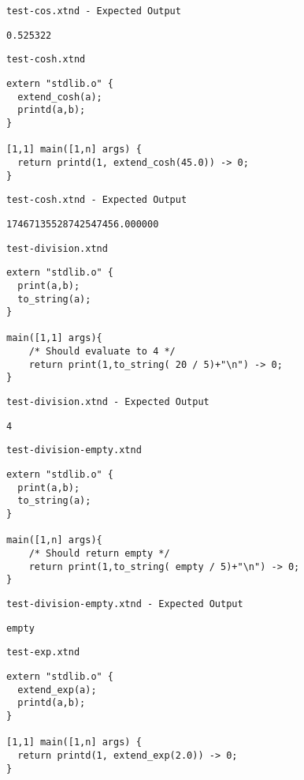 \medskip \noindent \texttt{test-cos.xtnd - Expected Output}


\begin{lstlisting}
0.525322
\end{lstlisting}


\medskip \noindent \texttt{test-cosh.xtnd}


\begin{lstlisting}
extern "stdlib.o" {
  extend_cosh(a);
  printd(a,b);
}

[1,1] main([1,n] args) {
  return printd(1, extend_cosh(45.0)) -> 0;
}
\end{lstlisting}


\medskip \noindent \texttt{test-cosh.xtnd - Expected Output}


\begin{lstlisting}
17467135528742547456.000000
\end{lstlisting}


\medskip \noindent \texttt{test-division.xtnd}


\begin{lstlisting}
extern "stdlib.o" {
  print(a,b);
  to_string(a);
}

main([1,1] args){
	/* Should evaluate to 4 */
	return print(1,to_string( 20 / 5)+"\n") -> 0;
}
\end{lstlisting}


\medskip \noindent \texttt{test-division.xtnd - Expected Output}


\begin{lstlisting}
4
\end{lstlisting}


\medskip \noindent \texttt{test-division-empty.xtnd}


\begin{lstlisting}
extern "stdlib.o" {
  print(a,b);
  to_string(a);
}

main([1,n] args){
	/* Should return empty */
	return print(1,to_string( empty / 5)+"\n") -> 0;
}
\end{lstlisting}


\medskip \noindent \texttt{test-division-empty.xtnd - Expected Output}


\begin{lstlisting}
empty
\end{lstlisting}


\medskip \noindent \texttt{test-exp.xtnd}


\begin{lstlisting}
extern "stdlib.o" {
  extend_exp(a);
  printd(a,b);
}

[1,1] main([1,n] args) {
  return printd(1, extend_exp(2.0)) -> 0;
}
\end{lstlisting}


